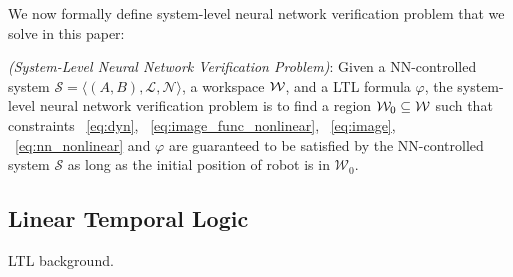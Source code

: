 We now formally define system-level neural network verification problem that we solve in this paper:
\begin{definition}
    \textit{(System-Level Neural Network Verification Problem)}: 
    Given a NN-controlled system $\mathcal{S} = \langle (A, B), \mathcal{L}, \mathcal{N} \rangle$, 
    a workspace ${\mathcal{W}}$, and a LTL formula $\varphi$, the system-level neural network verification problem is to find 
    a region $\mathcal{W}_0 \subseteq {\mathcal{W}}$ such that 
    constraints ~\eqref{eq:dyn}, ~\eqref{eq:image_func_nonlinear}, ~\eqref{eq:image}, ~\eqref{eq:nn_nonlinear}
    and $\varphi$ are guaranteed to be satisfied by the NN-controlled system $\mathcal{S}$
    as long as the initial position of robot is in $\mathcal{W}_0$.
\end{definition}    


\subsection{Linear Temporal Logic}

{\color{blue} LTL background.}



